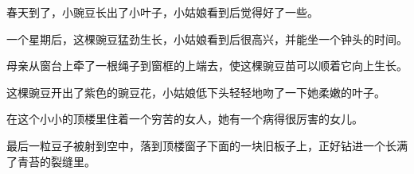\documentclass[UTF8]{ctexart}
\begin{document}


\kh 春天到了，小豌豆长出了小叶子，小姑娘看到后觉得好了一些。

\kh 一个星期后，这棵豌豆猛劲生长，小姑娘看到后很高兴，并能坐一个钟头的时间。

\kh 母亲从窗台上牵了一根绳子到窗框的上端去，使这棵豌豆苗可以顺着它向上生长。

\kh 这棵豌豆开出了紫色的豌豆花，小姑娘低下头轻轻地吻了一下她柔嫩的叶子。

\kh 在这个小小的顶楼里住着一个穷苦的女人，她有一个病得很厉害的女儿。

\setlength{\hangindent}{5.4em}\kh 最后一粒豆子被射到空中，落到顶楼窗子下面的一块旧板子上，正好钻进一个长满了青苔的裂缝里。
\end{document}

